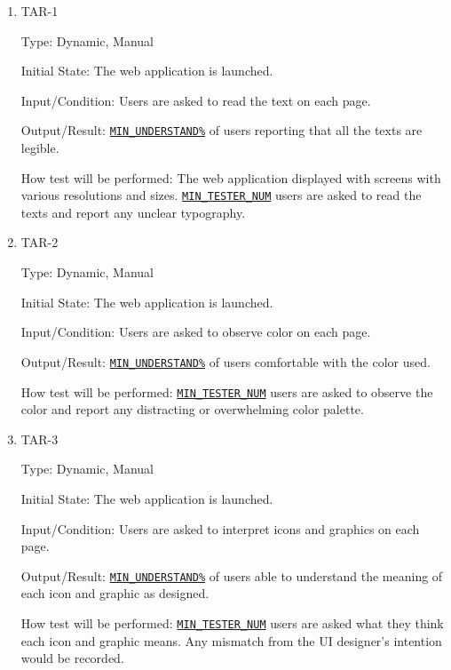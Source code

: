 \documentclass[12pt, titlepage]{article}
\begin{document}
\begin{enumerate}

\item{TAR-1\\}\label{TAR-1}

Type: Dynamic, Manual
					
Initial State: The web application is launched.
					
Input/Condition: Users are asked to read the text on each page.
					
Output/Result:  \hyperref[MIN_UNDERSTAND]{\texttt{MIN\_UNDERSTAND\%}} of users reporting that all the texts are legible.
					
How test will be performed: The web application displayed with screens with various resolutions and sizes. \hyperref[MIN_TESTER_NUM]{\texttt{MIN\_TESTER\_NUM}} users are asked to read the texts and report any unclear typography.
					
\item{TAR-2\\}\label{TAR-2}

Type: Dynamic, Manual
					
Initial State: The web application is launched.
					
Input/Condition: Users are asked to observe color on each page.
					
Output/Result: \hyperref[MIN_UNDERSTAND]{\texttt{MIN\_UNDERSTAND\%}} of users comfortable with the color used.
					
How test will be performed: \hyperref[MIN_TESTER_NUM]{\texttt{MIN\_TESTER\_NUM}} users are asked to observe the color and report any distracting or overwhelming color palette.

\item{TAR-3\\}\label{TAR-3}

Type: Dynamic, Manual
					
Initial State: The web application is launched.
					
Input/Condition: Users are asked to interpret icons and graphics on each page.
					
Output/Result: \hyperref[MIN_UNDERSTAND]{\texttt{MIN\_UNDERSTAND\%}} of users able to understand the meaning of each icon and graphic as designed.
					
How test will be performed: \hyperref[MIN_TESTER_NUM]{\texttt{MIN\_TESTER\_NUM}} users are asked what they think each icon and graphic means. Any mismatch from the UI designer's intention would be recorded.


\end{enumerate}
\end{document}
